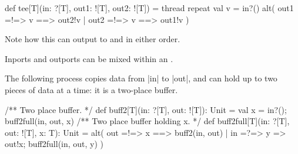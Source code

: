 \documentclass[notes,color]{sepslide0}
\begin{document}

\begin{slide}

\begin{scala}
def tee[T](in: ?[T], out1: ![T], out2: ![T]) = thread{
  repeat{ 
    val v = in?()
    alt( out1 =!=> { v } ==> { out2!v }
       | out2 =!=> { v } ==> { out1!v }
    )
  }
}
\end{scala}
%
Note how this can output to  and  in either order.
\end{slide}


\begin{slide}

Inports and outports can be mixed within an .

The following process copies data from |in| to |out|, and can hold up to two
pieces of data at a time: it is a two-place buffer.
%
\begin{scala}  
  /** Two place buffer. */
  def buff2[T](in: ?[T], out: ![T]): Unit = {
    val x = in?(); buff2full(in, out, x)
  }
  /** Two place buffer holding x. */
  def buff2full[T](in: ?[T], out: ![T], x: T): Unit = {
    alt(
      out =!=> { x } ==> { buff2(in, out) }
      | in =?=> { y => out!x; buff2full(in, out, y) }
    )
  }  
\end{scala}

\end{slide}

\end{document}
